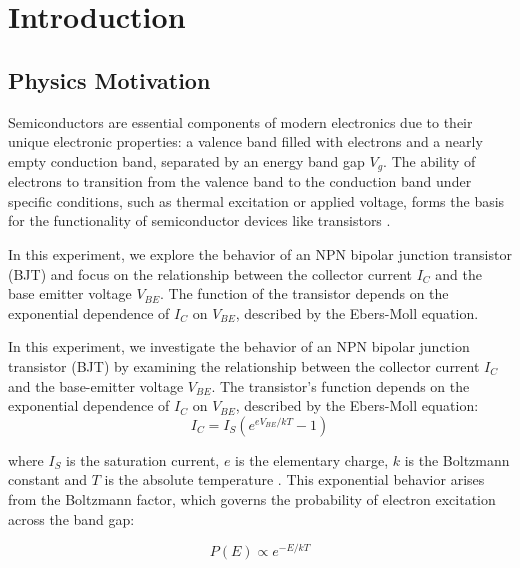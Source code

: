 \documentclass[12pt,letterpaper,twocolumn]{article}
\begin{document}

\section{Introduction}

\subsection{Physics Motivation}

Semiconductors are essential components of modern electronics due to their unique electronic properties: a valence band filled with electrons and a nearly empty conduction band, separated by an energy band gap \( V_g \). The ability of electrons to transition from the valence band to the conduction band under specific conditions, such as thermal excitation or applied voltage, forms the basis for the functionality of semiconductor devices like transistors \cite{Thornton}.

In this experiment, we explore the behavior of an NPN bipolar junction transistor (BJT) and focus on the relationship between the collector current \( I_C \) and the base emitter voltage \( V_{BE} \). The function of the transistor depends on the exponential dependence of \( I_C \) on \( V_{BE} \), described by the Ebers-Moll equation.

In this experiment, we investigate the behavior of an NPN bipolar junction transistor (BJT) by examining the relationship between the collector current \( I_C \) and the base-emitter voltage \( V_{BE} \). The transistor’s function depends on the exponential dependence of \( I_C \) on \( V_{BE} \), described by the Ebers-Moll equation:
\begin{equation}\label{eq1}
I_C = I_S \left(e^{eV_{BE}/kT} - 1\right)
\end{equation}

where \( I_S \) is the saturation current, \( e \) is the elementary charge, \( k \) is the Boltzmann constant and \( T \) is the absolute temperature \cite{Neudeck}. This exponential behavior arises from the Boltzmann factor, which governs the probability of electron excitation across the band gap:

\begin{equation}\label{eq2}
P(E) \propto e^{-E/kT}
\end{equation}
\end{document}
